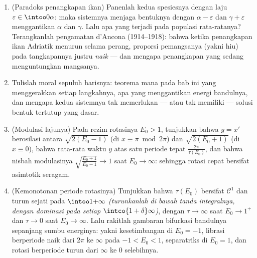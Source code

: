 \begin{problem}
\begin{enumerate}[resume]
\[        \qquad
        \frac1T\int_0^Ty(t)\,\dd t = \frac\alpha\beta :
        \]
        yakni rata-rata waktunya sama dengan nilai kesetimbangannya,
        berapa pun amplitudonya \emph{(integralkanlah $(\ln x)' =
        \alpha - \beta y$ atas satu periode)}.
  \item (Paradoks penangkapan ikan) Panenlah kedua spesiesnya dengan laju
        $\varepsilon \in \intoo0\alpha$: maka sistemnya menjaga
        bentuknya dengan $\alpha - \varepsilon$ dan $\gamma +
        \varepsilon$ menggantikan $\alpha$ dan $\gamma$. Lalu apa
        yang terjadi pada populasi rata-ratanya? Terangkanlah
        pengamatan d'Ancona (1914--1918): bahwa ketika penangkapan ikan Adriatik
        menurun selama perang, proporsi pemangsanya (yakni hiu) pada
        tangkapannya justru \emph{naik} ---
        dan mengapa penangkapan yang sedang menguntungkan mangsanya.
  \item Tulislah moral sepuluh barisnya: teorema mana pada
        bab ini yang menggerakkan setiap langkahnya, apa yang menggantikan
        energi bandulnya, dan mengapa kedua sistemnya tak memerlukan ---
        atau tak memiliki --- solusi bentuk tertutup yang dasar.

  \item (Modulasi lajunya) Pada rezim rotasinya $E_0 > 1$,
        tunjukkan bahwa $y = x'$ berosilasi antara
        $\sqrt{2(E_0 - 1)}$ (di $x \equiv \pi \bmod 2\pi$)
        dan $\sqrt{2(E_0 + 1)}$ (di $x \equiv 0$), bahwa
        rata-rata waktu $y$ atas satu periode tepat
        $\frac{2\pi}{\tau(E_0)}$, dan bahwa nisbah
        modulasinya $\sqrt{\frac{E_0 + 1}{E_0 - 1}} \to 1$ saat $E_0
        \to \infty$: sehingga rotasi cepat bersifat asimtotik
        seragam.
  \item (Kemonotonan periode rotasinya) Tunjukkan bahwa
        $\tau(E_0)$ bersifat $\mathcal C^1$ dan turun
        sejati pada $\intoo1{+\infty}$
        \emph{(turunkanlah di bawah tanda integralnya, dengan
        dominasi pada setiap $\intco{1 + \delta}\infty$)},
        dengan $\tau \to \infty$ saat $E_0 \to 1^+$ dan $\tau
        \to 0$ saat $E_0 \to \infty$. Lalu rakitlah gambaran
        bifurkasi  bandulnya sepanjang sumbu
        energinya: yakni kesetimbangan di $E_0 = -1$, librasi
        berperiode naik dari $2\pi$ ke $\infty$ pada
        $-1 < E_0 < 1$, separatriks di $E_0 = 1$, dan
        rotasi berperiode turun dari $\infty$ ke
        $0$ selebihnya.

\end{enumerate}
\end{problem}
